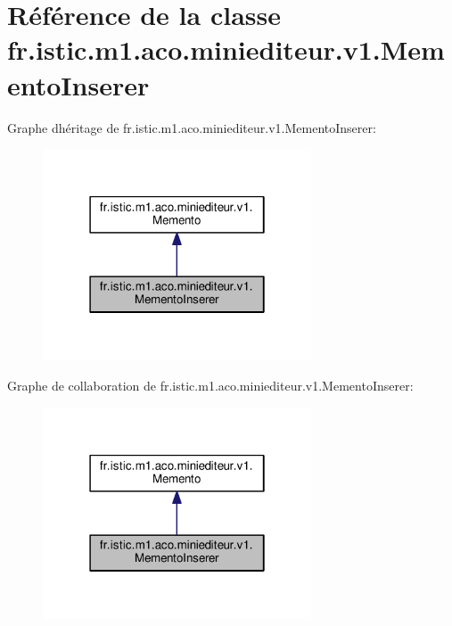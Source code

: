 \hypertarget{classfr_1_1istic_1_1m1_1_1aco_1_1miniediteur_1_1v1_1_1MementoInserer}{}\section{Référence de la classe fr.\+istic.\+m1.\+aco.\+miniediteur.\+v1.\+Memento\+Inserer}
\label{classfr_1_1istic_1_1m1_1_1aco_1_1miniediteur_1_1v1_1_1MementoInserer}


Graphe d\textquotesingle{}héritage de fr.\+istic.\+m1.\+aco.\+miniediteur.\+v1.\+Memento\+Inserer\+:
\nopagebreak
\begin{figure}[H]
\begin{center}
\leavevmode
\includegraphics[width=226pt]{classfr_1_1istic_1_1m1_1_1aco_1_1miniediteur_1_1v1_1_1MementoInserer__inherit__graph}
\end{center}
\end{figure}


Graphe de collaboration de fr.\+istic.\+m1.\+aco.\+miniediteur.\+v1.\+Memento\+Inserer\+:
\nopagebreak
\begin{figure}[H]
\begin{center}
\leavevmode
\includegraphics[width=226pt]{classfr_1_1istic_1_1m1_1_1aco_1_1miniediteur_1_1v1_1_1MementoInserer__coll__graph}
\end{center}
\end{figure}
